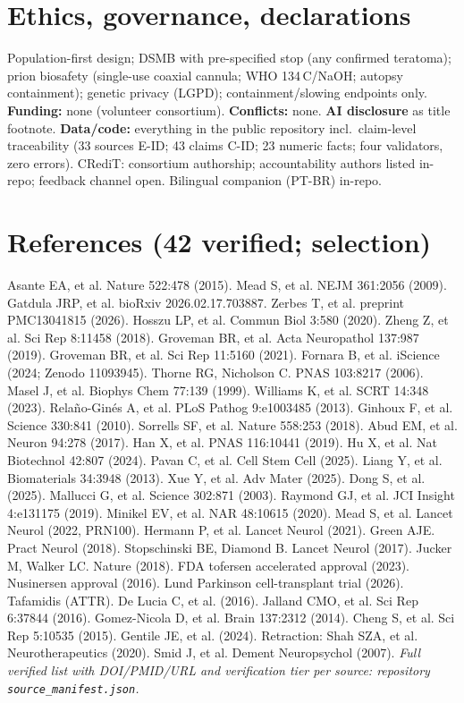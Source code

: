 \documentclass[10pt,twocolumn]{article}
\begin{document}
\section{Ethics, governance, declarations}
Population-first design; DSMB with pre-specified stop (any confirmed teratoma); prion biosafety (single-use coaxial cannula; WHO 134\,\textdegree C/NaOH; autopsy containment); genetic privacy (LGPD); containment/slowing endpoints only. \textbf{Funding:} none (volunteer consortium). \textbf{Conflicts:} none. \textbf{AI disclosure} as title footnote. \textbf{Data/code:} everything in the public repository incl.\ claim-level traceability (33 sources E-ID; 43 claims C-ID; 23 numeric facts; four validators, zero errors). CRediT: consortium authorship; accountability authors listed in-repo; feedback channel open. Bilingual companion (PT-BR) in-repo.



\section*{References (42 verified; selection)}
\small
Asante EA, et al. Nature 522:478 (2015). Mead S, et al. NEJM 361:2056 (2009). Gatdula JRP, et al. bioRxiv 2026.02.17.703887. Zerbes T, et al. preprint PMC13041815 (2026). Hosszu LP, et al. Commun Biol 3:580 (2020). Zheng Z, et al. Sci Rep 8:11458 (2018). Groveman BR, et al. Acta Neuropathol 137:987 (2019). Groveman BR, et al. Sci Rep 11:5160 (2021). Fornara B, et al. iScience (2024; Zenodo 11093945). Thorne RG, Nicholson C. PNAS 103:8217 (2006). Masel J, et al. Biophys Chem 77:139 (1999). Williams K, et al. SCRT 14:348 (2023). Rela\~no-Gin\'es A, et al. PLoS Pathog 9:e1003485 (2013). Ginhoux F, et al. Science 330:841 (2010). Sorrells SF, et al. Nature 558:253 (2018). Abud EM, et al. Neuron 94:278 (2017). Han X, et al. PNAS 116:10441 (2019). Hu X, et al. Nat Biotechnol 42:807 (2024). Pavan C, et al. Cell Stem Cell (2025). Liang Y, et al. Biomaterials 34:3948 (2013). Xue Y, et al. Adv Mater (2025). Dong S, et al. (2025). Mallucci G, et al. Science 302:871 (2003). Raymond GJ, et al. JCI Insight 4:e131175 (2019). Minikel EV, et al. NAR 48:10615 (2020). Mead S, et al. Lancet Neurol (2022, PRN100). Hermann P, et al. Lancet Neurol (2021). Green AJE. Pract Neurol (2018). Stopschinski BE, Diamond B. Lancet Neurol (2017). Jucker M, Walker LC. Nature (2018). FDA tofersen accelerated approval (2023). Nusinersen approval (2016). Lund Parkinson cell-transplant trial (2026). Tafamidis (ATTR). De Lucia C, et al. (2016). Jalland CMO, et al. Sci Rep 6:37844 (2016). Gomez-Nicola D, et al. Brain 137:2312 (2014). Cheng S, et al. Sci Rep 5:10535 (2015). Gentile JE, et al. (2024). Retraction: Shah SZA, et al. Neurotherapeutics (2020). Smid J, et al. Dement Neuropsychol (2007). \emph{Full verified list with DOI/PMID/URL and verification tier per source: repository \texttt{source\_manifest.json}.}
\end{document}
